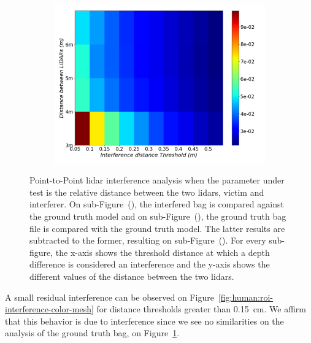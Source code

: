 \begin{figure}[!ht]
\begin{subfigure}[c]{0.45\textwidth}
		\caption{}
		\label{fig:human:roi-ground-truth-color-mesh}
	\end{subfigure}
	\\ \vspace{2mm}
	\begin{subfigure}[c]{0.6\textwidth}
		\centering
		\includegraphics[width=\textwidth]{img/lidar-interference/human/difference_roi_distance_color_mesh.png}
		\caption{}
		\label{fig:human:roi-difference-color-mesh}
	\end{subfigure}

	\caption[Point-to-Point analysis of the interference on the seleced \ac{roi} of the \textit{Human} dataset.]{Point-to-Point \ac{lidar} interference analysis when the parameter under test is the relative distance between the two \acp{lidar}, victim and interferer. On sub-Figure~(), the interfered bag is compared against the ground truth model and on sub-Figure~(), the ground truth bag file is compared with the ground truth model. The latter results are subtracted to the former, resulting on sub-Figure~(). For every sub-figure, the x-axis shows the threshold distance at which a depth difference is considered an interference and the y-axis shows the different values of the distance between the two \acp{lidar}.} 
	\label{fig:human:roi-color-mesh}
\end{figure}

A small residual interference can be observed on Figure~\ref{fig:human:roi-interference-color-mesh} for distance thresholds greater than \SI{0.15}{\centi\meter}. We affirm that this behavior is due to interference since we see no similarities on the analysis of the ground truth bag, on Figure~\ref{fig:human:roi-ground-truth-color-mesh}.

